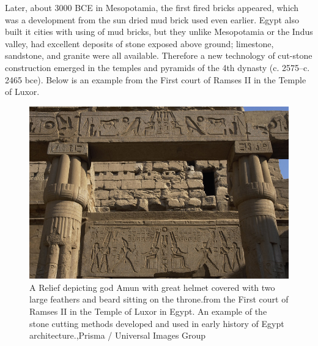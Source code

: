 Later, about 3000 BCE in Mesopotamia, the first fired bricks appeared, which was a development from the sun dried mud brick used even earlier.
Egypt also built it cities with using of mud bricks, but they unlike Mesopotamia or the Indus valley, had excellent deposits of stone exposed above ground; limestone, sandstone, and granite were all available.
Therefore a new technology of cut-stone construction emerged in the temples and pyramids of the 4th dynasty (c. 2575–c. 2465 bce)\cite{ref:buildConstrBrit}. Below is an example from the First court of Ramses II in the Temple of Luxor.

\begin{figure}[H]
\centering
\includegraphics[width=0.9\linewidth ]{figure/Introduction/EgyptArchitecture.jpg}
\caption{A Relief depicting god Amun with great helmet covered with two large feathers and beard sitting on the throne.from the First court of Ramses II in the Temple of Luxor in Egypt. An example of the stone cutting methods developed and used in early history of Egypt architecture.,Prisma / Universal Images Group
}
\end{figure}

